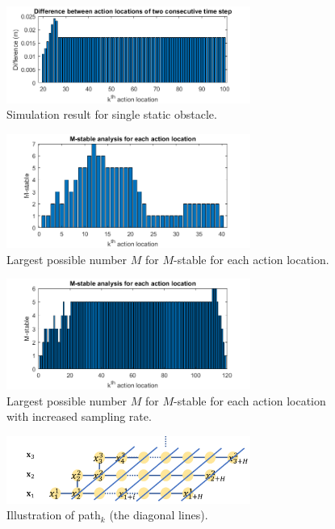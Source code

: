 \documentclass{ifacconf}
\begin{document}
\begin{figure}[htbp]
\begin{center}
\includegraphics[width=8cm]{src/1_1_4.png}
\caption{Simulation result for single static obstacle.}
\label{fig: mpc}
\end{center}
\end{figure}

\begin{figure}[htbp]
\begin{center}
\includegraphics[width=8cm]{src/1_2_M-stable.png}
\caption{Largest possible number $M$ for $M$-stable for each action location.}
\label{fig: mpc}
\end{center}
\end{figure}



\begin{figure}[htbp]
\begin{center}
\includegraphics[width=8cm]{src/1_2_M-stable_2.png}
\caption{Largest possible number $M$ for $M$-stable for each action location with increased sampling rate.}
\label{fig: mpc}
\end{center}
\end{figure}



\begin{figure}[htbp]
\begin{center}
\includegraphics[width=8cm]{src/1_3_path.png}
\caption{Illustration of path$_k$ (the diagonal lines).}
\label{fig: mpc}
\end{center}
\end{figure}
\end{document}
